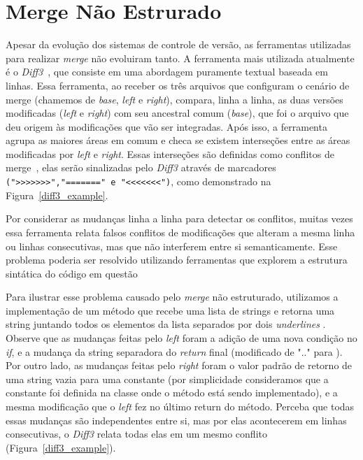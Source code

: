 \section{Merge Não Estrurado}
Apesar da evolução dos sistemas de controle de versão, as ferramentas
utilizadas para realizar \emph{merge} não evoluiram tanto. A ferramenta mais
utilizada atualmente é o \emph{Diff3}~\cite{mens02}, que consiste em uma
abordagem puramente textual baseada em linhas. Essa ferramenta, ao receber os
três arquivos que configuram o cenário de merge (chamemos de \emph{base},
\emph{left} e \emph{right}), compara, linha a linha, as duas versões
modificadas (\emph{left} e \emph{right}) com seu ancestral comum (\emph{base}),
que foi o arquivo que deu origem às modificações que vão ser integradas. Após
isso, a ferramenta agrupa as maiores áreas em comum e checa se existem
interseções entre as áreas modificadas por \emph{left} e \emph{right}. Essas
interseções são definidas como conflitos de merge~\cite{khan07}, elas serão
sinalizadas pelo \emph{Diff3} através de marcadores
\verb|(">>>>>>>","=======" e "<<<<<<<")|, como demonstrado na
Figura~\ref{diff3_example}.

Por considerar as mudanças linha a linha para detectar os conflitos, muitas
vezes essa ferramenta relata falsos conflitos de modificações que alteram a
mesma linha ou linhas consecutivas, mas que não interferem entre si
semanticamente. Esse problema poderia ser resolvido utilizando ferramentas que
explorem a estrutura sintática do código em questão~\cite{cavalcanti19}

Para ilustrar esse problema causado pelo \emph{merge} não estruturado,
utilizamos a implementação de um método  que recebe uma
lista de strings e retorna uma string juntando todos os elementos da lista
separados por dois \emph{underlines} . Observe que as
mudanças feitas pelo \emph{left} foram a adição de uma nova condição no
\emph{if}, e a mudança da string separadora do \emph{return} final (modificado
de ".." para ). Por outro lado, as mudanças feitas pelo
\emph{right} foram o valor padrão de retorno de uma string vazia para uma
constante (por simplicidade consideramos que a constante foi definida na classe
onde o método está sendo implementado), e a mesma modificação que o \emph{left}
fez no último return do método. Perceba que todas essas mudanças são
independentes entre si, mas por elas acontecerem em linhas consecutivas, o
\emph{Diff3} relata todas elas em um mesmo conflito
(Figura~\ref{diff3_example}).

